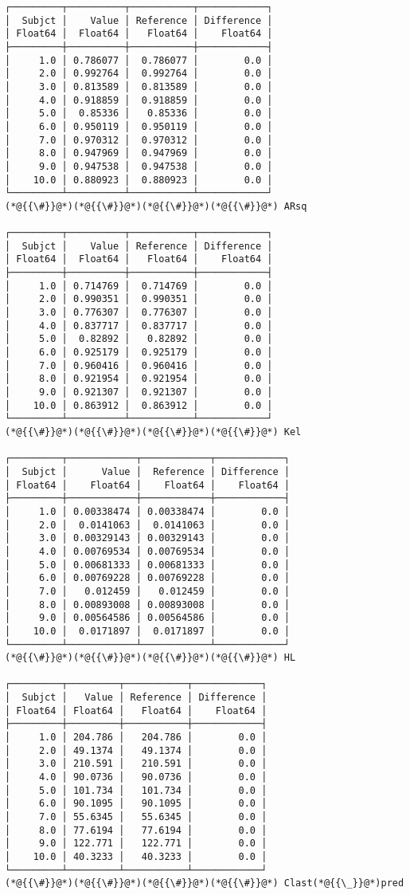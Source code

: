 \documentclass[12pt,a4paper]{article}
\begin{document}
\begin{lstlisting}
┌─────────┬──────────┬───────────┬────────────┐
│  Subjct │    Value │ Reference │ Difference │
│ Float64 │  Float64 │   Float64 │    Float64 │
├─────────┼──────────┼───────────┼────────────┤
│     1.0 │ 0.786077 │  0.786077 │        0.0 │
│     2.0 │ 0.992764 │  0.992764 │        0.0 │
│     3.0 │ 0.813589 │  0.813589 │        0.0 │
│     4.0 │ 0.918859 │  0.918859 │        0.0 │
│     5.0 │  0.85336 │   0.85336 │        0.0 │
│     6.0 │ 0.950119 │  0.950119 │        0.0 │
│     7.0 │ 0.970312 │  0.970312 │        0.0 │
│     8.0 │ 0.947969 │  0.947969 │        0.0 │
│     9.0 │ 0.947538 │  0.947538 │        0.0 │
│    10.0 │ 0.880923 │  0.880923 │        0.0 │
└─────────┴──────────┴───────────┴────────────┘
(*@{{\#}}@*)(*@{{\#}}@*)(*@{{\#}}@*)(*@{{\#}}@*) ARsq

┌─────────┬──────────┬───────────┬────────────┐
│  Subjct │    Value │ Reference │ Difference │
│ Float64 │  Float64 │   Float64 │    Float64 │
├─────────┼──────────┼───────────┼────────────┤
│     1.0 │ 0.714769 │  0.714769 │        0.0 │
│     2.0 │ 0.990351 │  0.990351 │        0.0 │
│     3.0 │ 0.776307 │  0.776307 │        0.0 │
│     4.0 │ 0.837717 │  0.837717 │        0.0 │
│     5.0 │  0.82892 │   0.82892 │        0.0 │
│     6.0 │ 0.925179 │  0.925179 │        0.0 │
│     7.0 │ 0.960416 │  0.960416 │        0.0 │
│     8.0 │ 0.921954 │  0.921954 │        0.0 │
│     9.0 │ 0.921307 │  0.921307 │        0.0 │
│    10.0 │ 0.863912 │  0.863912 │        0.0 │
└─────────┴──────────┴───────────┴────────────┘
(*@{{\#}}@*)(*@{{\#}}@*)(*@{{\#}}@*)(*@{{\#}}@*) Kel

┌─────────┬────────────┬────────────┬────────────┐
│  Subjct │      Value │  Reference │ Difference │
│ Float64 │    Float64 │    Float64 │    Float64 │
├─────────┼────────────┼────────────┼────────────┤
│     1.0 │ 0.00338474 │ 0.00338474 │        0.0 │
│     2.0 │  0.0141063 │  0.0141063 │        0.0 │
│     3.0 │ 0.00329143 │ 0.00329143 │        0.0 │
│     4.0 │ 0.00769534 │ 0.00769534 │        0.0 │
│     5.0 │ 0.00681333 │ 0.00681333 │        0.0 │
│     6.0 │ 0.00769228 │ 0.00769228 │        0.0 │
│     7.0 │   0.012459 │   0.012459 │        0.0 │
│     8.0 │ 0.00893008 │ 0.00893008 │        0.0 │
│     9.0 │ 0.00564586 │ 0.00564586 │        0.0 │
│    10.0 │  0.0171897 │  0.0171897 │        0.0 │
└─────────┴────────────┴────────────┴────────────┘
(*@{{\#}}@*)(*@{{\#}}@*)(*@{{\#}}@*)(*@{{\#}}@*) HL

┌─────────┬─────────┬───────────┬────────────┐
│  Subjct │   Value │ Reference │ Difference │
│ Float64 │ Float64 │   Float64 │    Float64 │
├─────────┼─────────┼───────────┼────────────┤
│     1.0 │ 204.786 │   204.786 │        0.0 │
│     2.0 │ 49.1374 │   49.1374 │        0.0 │
│     3.0 │ 210.591 │   210.591 │        0.0 │
│     4.0 │ 90.0736 │   90.0736 │        0.0 │
│     5.0 │ 101.734 │   101.734 │        0.0 │
│     6.0 │ 90.1095 │   90.1095 │        0.0 │
│     7.0 │ 55.6345 │   55.6345 │        0.0 │
│     8.0 │ 77.6194 │   77.6194 │        0.0 │
│     9.0 │ 122.771 │   122.771 │        0.0 │
│    10.0 │ 40.3233 │   40.3233 │        0.0 │
└─────────┴─────────┴───────────┴────────────┘
(*@{{\#}}@*)(*@{{\#}}@*)(*@{{\#}}@*)(*@{{\#}}@*) Clast(*@{{\_}}@*)pred


\end{lstlisting}
\end{document}
